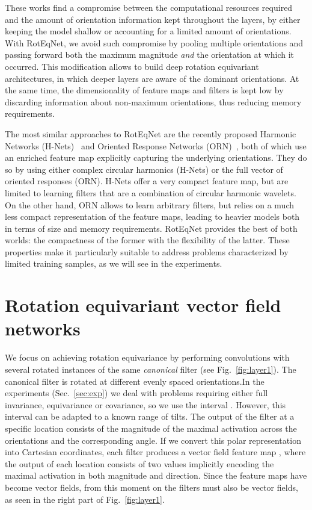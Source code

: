 \documentclass[10pt,twocolumn,letterpaper,table]{article}
\begin{document}
These works find a compromise between the computational resources required and the amount of orientation information kept throughout the layers, by either keeping the model shallow or accounting for a limited amount of orientations. With RotEqNet, we avoid such compromise by pooling multiple orientations and passing forward both the maximum magnitude \emph{and} the orientation at which it occurred. This modification allows to build deep rotation equivariant architectures, in which deeper layers are aware of the dominant orientations. At the same time, the dimensionality of feature maps and filters is kept low by discarding information about non-maximum orientations, thus reducing memory requirements.
	
The most similar approaches to RotEqNet are the recently proposed Harmonic Networks (H-Nets)~\cite{worrall2016harmonic} and Oriented Response Networks (ORN)~\cite{zhou2017oriented}, both of which use an enriched feature map explicitly capturing the underlying orientations. They do so by using either complex circular harmonics (H-Nets) or the full vector of oriented responses (ORN). H-Nets offer a very compact feature map, but are limited to learning filters that are a combination of circular harmonic wavelets. On the other hand, ORN allows to learn arbitrary filters, but relies on a much less compact representation of the feature maps, leading to heavier models both in terms of size and memory requirements. RotEqNet provides the best of both worlds: the compactness of the former with the flexibility of the latter. These properties make it particularly suitable to address problems characterized by limited training samples, as we will see in the experiments.

\section{Rotation equivariant vector field networks}
	
We focus on achieving rotation equivariance by performing convolutions with several rotated instances of the same \emph{canonical} filter (see Fig.~\ref{fig:layer1}). The canonical filter  is rotated at  different evenly spaced orientations.In the experiments (Sec.~\ref{sec:exp}) we deal with problems requiring either full invariance, equivariance or covariance, so we use the interval . However, this interval can be adapted to a  known range of tilts.
The output of the filter  at a specific location consists of the magnitude of the maximal activation across the orientations and the corresponding angle. If we convert this polar representation into Cartesian coordinates, each filter  produces a vector field feature map , where the output of each location consists of two values  implicitly encoding the maximal activation in both magnitude and direction. Since the feature maps have become vector fields, from this moment on the filters must also be vector fields, as seen in the right part of Fig.~\ref{fig:layer1}.
	
\end{document}
